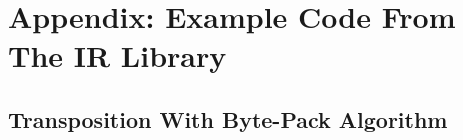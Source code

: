 
%
%

\chapter*{Appendix: Example Code From The IR Library}\label{app:one}

\section*{Transposition With Byte-Pack Algorithm}
\label{appone:transposition}

